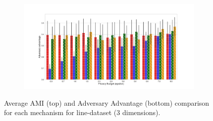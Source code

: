 \begin{figure}[H]
\begin{subfigure}{1\textwidth}
            \includegraphics[width=1\textwidth]{Results/kd-laplace/shokri_mi_adv_line-dataset_comparison.png}
      \end{subfigure}
      \caption{Average AMI (top) and Adversary Advantage (bottom) comparison for each mechanism for line-dataset (3 dimensions).}
      \label{fig:utility_line-dataset_comparison_nd_plot}
\end{figure}
\newpage




